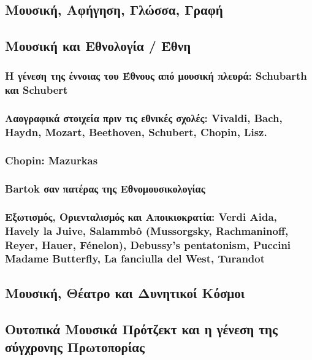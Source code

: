\subsubsection{}
\label{sec:org4b7145f}
\subsection{Μουσική, Αφήγηση, Γλώσσα, Γραφή}
\label{sec:org01d21d0}
\subsection{Μουσική και Εθνολογία / Έθνη}
\label{sec:org8786772}
\subsubsection{Η γένεση της έννοιας του Έθνους από μουσική πλευρά: Schubarth και Schubert}
\label{sec:orgdf62755}
\subsubsection{Λαογραφικά στοιχεία πριν τις εθνικές σχολές: Vivaldi, Bach, Haydn, Mozart, Beethoven, Schubert, Chopin, Lisz.}
\label{sec:orgc1ac624}
\subsubsection{Chopin: Mazurkas}
\label{sec:org3c82ce0}
\subsubsection{Bartok σαν πατέρας της Εθνομουσικολογίας}
\label{sec:org4243220}
\subsubsection{Εξωτισμός, Οριενταλισμός και Αποικιοκρατία: Verdi Aida, Havely la Juive, Salammbô (Mussorgsky, Rachmaninoff, Reyer, Hauer, Fénelon), Debussy's pentatonism, Puccini Madame Butterfly, La fanciulla del West, Turandot}
\label{sec:org6b0bf01}
\subsection{Μουσική, Θέατρο και Δυνητικοί Κόσμοι}
\label{sec:orgf305c7c}
\subsection{Ουτοπικά Μουσικά Πρότζεκτ και η γένεση της σύγχρονης Πρωτοπορίας}
\label{sec:orgf9f71ec}
\subsubsection{}
\label{sec:org43c8713}
